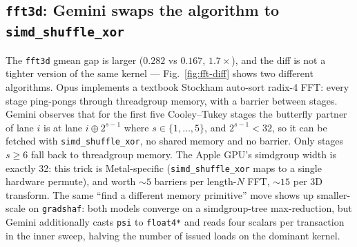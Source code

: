 \documentclass{article}
\theoremstyle{plain}
\theoremstyle{definition}
\theoremstyle{remark}
\begin{document}
\subsection{\texttt{fft3d}: Gemini swaps the algorithm to \texttt{simd\_shuffle\_xor}}

The \texttt{fft3d} gmean gap is larger ($0.282$ vs $0.167$, $1.7\times$), and
the diff is not a tighter version of the same kernel ---
Fig.~\ref{fig:fft-diff} shows two different algorithms. Opus
implements a textbook Stockham auto-sort radix-4 FFT: every stage
ping-pongs through threadgroup memory, with a barrier between stages.
Gemini observes that for the first five Cooley--Tukey stages the
butterfly partner of lane $i$ is at lane $i \oplus 2^{s-1}$ where
$s\in\{1,\ldots,5\}$, and $2^{s-1}<32$, so it can be fetched with
\texttt{simd\_shuffle\_xor}, no shared memory and no barrier. Only
stages $s\geq 6$ fall back to threadgroup memory. The Apple GPU's
simdgroup width is exactly 32: this trick is Metal-specific
(\texttt{simd\_shuffle\_xor} maps to a single hardware permute), and
worth $\sim 5$ barriers per length-$N$ FFT, $\sim 15$ per 3D
transform. The same ``find a different memory primitive'' move shows
up smaller-scale on \texttt{gradshaf}: both models converge on a
simdgroup-tree max-reduction, but Gemini additionally casts
\texttt{psi} to \texttt{float4*} and reads four scalars per
transaction in the inner sweep, halving the number of issued loads
on the dominant kernel.
\end{document}
